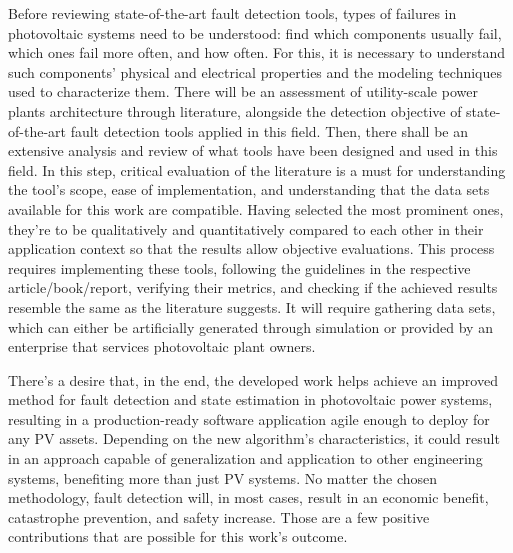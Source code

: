 Before reviewing state-of-the-art fault detection tools, types of failures in
photovoltaic systems need to be understood: find which components usually fail,
which ones fail more often, and how often. For this, it is necessary to
understand such components' physical and electrical properties and the modeling
techniques used to characterize them. There will be an assessment of
utility-scale power plants architecture through literature, alongside the
detection objective of state-of-the-art fault detection tools applied in this
field. Then, there shall be an extensive analysis and review of what tools have
been designed and used in this field. In this step, critical evaluation of the
literature is a must for understanding the tool's scope, ease of implementation,
and understanding that the data sets available for this work are compatible.
Having selected the most prominent ones, they're to be qualitatively and
quantitatively compared to each other in their application context so that the
results allow objective evaluations. This process requires implementing these
tools, following the guidelines in the respective article/book/report, verifying
their metrics, and checking if the achieved results resemble the same as the
literature suggests. It will require gathering data sets, which can either be
artificially generated through simulation or provided by an enterprise that
services photovoltaic plant owners.


There's a desire that, in the end, the developed work helps achieve an improved
method for fault detection and state estimation in photovoltaic power systems,
resulting in a production-ready software application agile enough to deploy for
any PV assets. Depending on the new algorithm's characteristics, it could result
in an approach capable of generalization and application to other engineering
systems, benefiting more than just PV systems. No matter the chosen methodology,
fault detection will, in most cases, result in an economic benefit, catastrophe
prevention, and safety increase. Those are a few positive contributions that are
possible for this work's outcome.